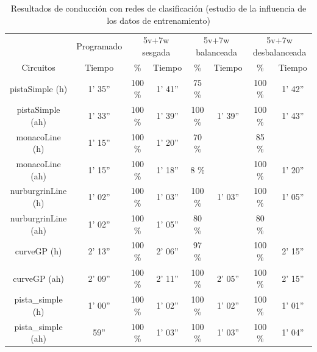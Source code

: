\begin{table}[H]
\centering
\caption{Resultados de conducción con redes de clasificación (estudio de la influencia de los datos de entrenamiento)}
\label{resultados_classificacion_bases_datos}
\begin{tabular}{c|c|c|c|c|c|c|c|}
\cline{2-8}
                          & \multicolumn{1}{c|}{Programado} & \multicolumn{2}{c|}{5v+7w sesgada} & \multicolumn{2}{c|}{5v+7w balanceada} & \multicolumn{2}{c|}{5v+7w desbalanceada} \\ \cline{1-8} 
                        \multicolumn{1}{|c|}{Circuitos}    & Tiempo       & \%       & Tiempo       & \%        & Tiempo       & \%      & Tiempo     \\ \hline
\multicolumn{1}{|c|}{pistaSimple (h)}    & 1' 35''           & 100 \%         & 1' 41''           & 75 \%          &            & 100 \%       & 1' 42''      \\ \hline
\multicolumn{1}{|c|}{pistaSimple (ah)}     & 1' 33''           & 100 \%          & 1' 39''            & 100 \%           & 1' 39''           & 100 \%       & 1' 43''       \\ \hline
\multicolumn{1}{|c|}{monacoLine (h)}      & 1' 15''           & 100 \%           & 1' 20''            & 70 \%       &             & 85 \%       &           \\ \hline
\multicolumn{1}{|c|}{monacoLine (ah)}       & 1' 15''            & 100 \%       & 1' 18''            & 8 \%           &             & 100 \%          & 1' 20''       \\ \hline
\multicolumn{1}{|c|}{nurburgrinLine (h)}      & 1' 02''            & 100 \%          & 1' 03''            & 100 \%        & 1' 03''            & 100 \%       & 1' 05''      \\ \hline
\multicolumn{1}{|c|}{nurburgrinLine (ah)}       & 1' 02''           & 100 \%           & 1' 05''           & 80 \%        &            & 80 \%       &       \\ \hline
\multicolumn{1}{|c|}{curveGP (h)}     & 2' 13''           & 100 \%           & 2' 06''            & 97 \%        &            & 100 \%       & 2' 15''      \\ \hline
\multicolumn{1}{|c|}{curveGP (ah)}       & 2' 09''            & 100 \%         & 2' 11''            & 100 \%        & 2' 05''           & 100 \%      & 2' 15''     \\ \hline
\multicolumn{1}{|c|}{pista\_simple (h)}       & 1' 00''           & 100 \%          & 1' 02''            & 100 \%        & 1' 02''             & 100 \%      & 1' 01''       \\ \hline
\multicolumn{1}{|c|}{pista\_simple (ah)}     & 59''            & 100 \%          & 1' 03''          & 100 \%        & 1' 03''             & 100 \%      & 1' 04''        \\ \hline
\end{tabular}
\end{table}


